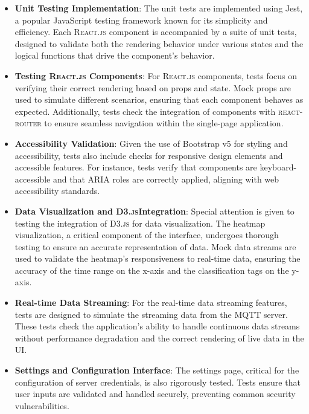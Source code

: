 \begin{itemize}
  \item \textbf{Unit Testing Implementation}: The unit tests are implemented using Jest, a popular JavaScript testing framework known for its simplicity and efficiency. Each \textsc{React.js} component is accompanied by a suite of unit tests, designed to validate both the rendering behavior under various states and the logical functions that drive the component's behavior.
  \item \textbf{Testing \textsc{React.js} Components}: For \textsc{React.js} components, tests focus on verifying their correct rendering based on props and state. Mock props are used to simulate different scenarios, ensuring that each component behaves as expected. Additionally, tests check the integration of components with \textsc{react-router} to ensure seamless navigation within the single-page application.
  \item \textbf{Accessibility Validation}: Given the use of Bootstrap v5 for styling and accessibility, tests also include checks for responsive design elements and accessible features. For instance, tests verify that components are keyboard-accessible and that ARIA roles are correctly applied, aligning with web accessibility standards.
  \item \textbf{Data Visualization and \textsc{D3.js}Integration}: Special attention is given to testing the integration of \textsc{D3.js} for data visualization. The heatmap visualization, a critical component of the interface, undergoes thorough testing to ensure an accurate representation of data. Mock data streams are used to validate the heatmap's responsiveness to real-time data, ensuring the accuracy of the time range on the x-axis and the classification tags on the y-axis.
  \item \textbf{Real-time Data Streaming}: For the real-time data streaming features, tests are designed to simulate the streaming data from the MQTT server. These tests check the application's ability to handle continuous data streams without performance degradation and the correct rendering of live data in the UI.
  \item \textbf{Settings and Configuration Interface}: The settings page, critical for the configuration of server credentials, is also rigorously tested. Tests ensure that user inputs are validated and handled securely, preventing common security vulnerabilities.
\end{itemize}

